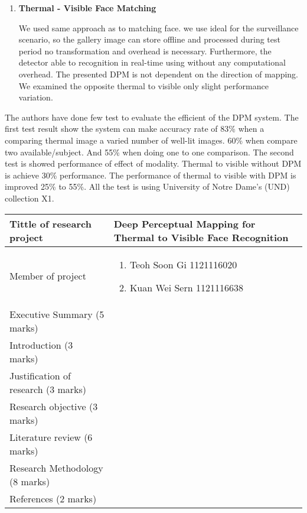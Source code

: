 \documentclass[a4paper, 12pt]{article}
\begin{document}
\begin{enumerate}[I]
\item\textbf{{\large  Thermal - Visible Face Matching}}

We used same approach as \cite{3} to matching face. we use ideal for the surveillance scenario, so the gallery image can store offline and processed during test period no transformation and overhead is necessary. Furthermore, the detector able to recognition in real-time using without any computational overhead. The presented DPM is not dependent on the direction of mapping. We examined the opposite thermal to visible only slight performance variation.  

\end{enumerate}
The authors have done few test to evaluate the efficient of the DPM system. The first test result show the system can make accuracy rate of 83\% when a comparing thermal image a varied number of well-lit images. 60\% when compare two available/subject. And 55\% when doing one to one comparison. The second test is showed performance of effect of modality. Thermal to visible without DPM is achieve 30\% performance. The performance of thermal to visible with DPM is improved  25\% to 55\%. All the test is using University of Notre Dame's (UND) collection X1.
  
{}

\begin{table}[h]
\begin{tabularx}{1.0\linewidth}{|l|X|}
\hline
Tittle of research project        & Deep Perceptual Mapping for Thermal to Visible Face Recognition \\

\hline

Member of project  &  \begin{enumerate}
  \item Teoh Soon Gi 1121116020
  \item Kuan Wei Sern 1121116638
\end{enumerate}\\

\hline

Executive Summary (5 marks) & \\

\hline

Introduction  (3 marks) & \\
\hline
Justification of research (3 marks)& \\
\hline
Research objective (3 marks)& \\
\hline
Literature review  (6 marks)& \\
\hline
Research Methodology  (8 marks)& \\
\hline
References (2 marks)& \\
\hline

\end{tabularx}
\end{table}
\end{document}
